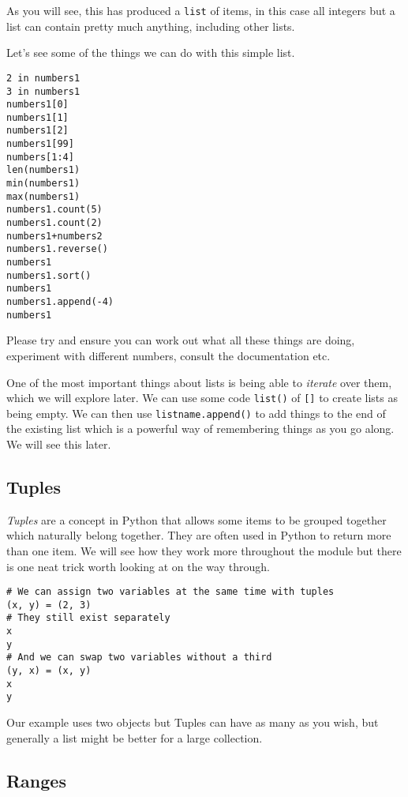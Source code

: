 \documentclass[12pt,oneside]{cttutorial}
\begin{document}
As you will see, this has produced a \lstinline!list! of items, in this case all integers but a list can contain pretty much anything, including other lists.

Let's see some of the things we can do with this simple list.

\begin{lstlisting}
2 in numbers1
3 in numbers1
numbers1[0]
numbers1[1]
numbers1[2]
numbers1[99]
numbers[1:4]
len(numbers1)
min(numbers1)
max(numbers1)
numbers1.count(5)
numbers1.count(2)
numbers1+numbers2
numbers1.reverse()
numbers1
numbers1.sort()
numbers1
numbers1.append(-4)
numbers1
\end{lstlisting}

Please try and ensure you can work out what all these things are doing, experiment with different numbers, consult the documentation etc.

One of the most important things about lists is being able to \emph{iterate} over them, which we will explore later. We can  use some code \lstinline!list()! of \lstinline![]! to create lists as being empty. We can then use \lstinline!listname.append()! to add things to the end of the existing list which is a powerful way of remembering things as you go along. We will see this later.

\subsection{Tuples}

\emph{Tuples} are a concept in Python that allows some items to be grouped together which naturally belong together. They are often used in Python to return more than one item. We will see how they work more throughout the module but there is one neat trick worth looking at on the way through.

\begin{lstlisting}
# We can assign two variables at the same time with tuples
(x, y) = (2, 3) 
# They still exist separately
x
y
# And we can swap two variables without a third
(y, x) = (x, y)
x
y
\end{lstlisting}

Our example uses two objects but Tuples can have as many as you wish, but generally a list might be better for a large collection.

\subsection{Ranges}
\end{document}

